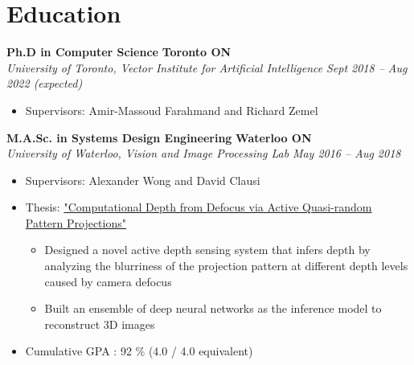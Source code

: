 \section*{Education}
\vspace{\postsubhead}
    \textbf{Ph.D in Computer Science}
    \hfill
    \textbf{Toronto ON}\\
    \textit{University of Toronto, Vector Institute for Artificial Intelligence}
    \hfill
    \textit{Sept 2018 -- Aug 2022 (expected)}
    \begin{itemize}
        \item Supervisors: Amir-Massoud Farahmand and Richard Zemel
    \end{itemize}
    \vspace{\interlist}
    
    \textbf{M.A.Sc. in Systems Design Engineering}
    \hfill
    \textbf{Waterloo ON}\\
    \textit{University of Waterloo, Vision and Image Processing Lab}
    \hfill
    \textit{May 2016 -- Aug 2018}
    \begin{itemize}
        \item Supervisors: Alexander Wong and David Clausi
        \item Thesis: \href{https://uwspace.uwaterloo.ca/handle/10012/13645}{"Computational Depth from Defocus via Active Quasi-random Pattern Projections"}
        \begin{itemize}
            \item Designed a novel active depth sensing system that infers depth by analyzing the blurriness of the projection pattern at different depth levels caused by camera defocus
            \item Built an ensemble of deep neural networks as the inference model to reconstruct 3D images
        \end{itemize}
        \item Cumulative GPA : 92 \% (4.0 / 4.0 equivalent) 
    \end{itemize}
    \vspace{\interlist}

